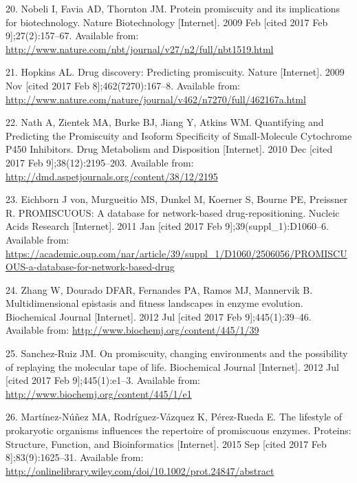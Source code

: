 \documentclass[12pt,twoside]{reedthesis}
\begin{document}
{  \hypertarget{ref-nobeli_protein_2009}{}
  20. Nobeli I, Favia AD, Thornton JM. Protein promiscuity and its
  implications for biotechnology. Nature Biotechnology {[}Internet{]}.
  2009 Feb {[}cited 2017 Feb 9{]};27(2):157--67. Available from:
  \url{http://www.nature.com/nbt/journal/v27/n2/full/nbt1519.html}
  
  \hypertarget{ref-hopkins_drug_2009}{}
  21. Hopkins AL. Drug discovery: Predicting promiscuity. Nature
  {[}Internet{]}. 2009 Nov {[}cited 2017 Feb 8{]};462(7270):167--8.
  Available from:
  \url{http://www.nature.com/nature/journal/v462/n7270/full/462167a.html}
  
  \hypertarget{ref-nath_quantifying_2010}{}
  22. Nath A, Zientek MA, Burke BJ, Jiang Y, Atkins WM. Quantifying and
  Predicting the Promiscuity and Isoform Specificity of Small-Molecule
  Cytochrome P450 Inhibitors. Drug Metabolism and Disposition
  {[}Internet{]}. 2010 Dec {[}cited 2017 Feb 9{]};38(12):2195--203.
  Available from: \url{http://dmd.aspetjournals.org/content/38/12/2195}
  
  \hypertarget{ref-von_eichborn_promiscuous:_2011}{}
  23. Eichborn J von, Murgueitio MS, Dunkel M, Koerner S, Bourne PE,
  Preissner R. PROMISCUOUS: A database for network-based
  drug-repositioning. Nucleic Acids Research {[}Internet{]}. 2011 Jan
  {[}cited 2017 Feb 9{]};39(suppl\_1):D1060--6. Available from:
  \url{https://academic.oup.com/nar/article/39/suppl_1/D1060/2506056/PROMISCUOUS-a-database-for-network-based-drug}
  
  \hypertarget{ref-zhang_multidimensional_2012}{}
  24. Zhang W, Dourado DFAR, Fernandes PA, Ramos MJ, Mannervik B.
  Multidimensional epistasis and fitness landscapes in enzyme evolution.
  Biochemical Journal {[}Internet{]}. 2012 Jul {[}cited 2017 Feb
  9{]};445(1):39--46. Available from:
  \url{http://www.biochemj.org/content/445/1/39}
  
  \hypertarget{ref-sanchez-ruiz_promiscuity_2012}{}
  25. Sanchez-Ruiz JM. On promiscuity, changing environments and the
  possibility of replaying the molecular tape of life. Biochemical Journal
  {[}Internet{]}. 2012 Jul {[}cited 2017 Feb 9{]};445(1):e1--3. Available
  from: \url{http://www.biochemj.org/content/445/1/e1}
  
  \hypertarget{ref-martinez-nunez_lifestyle_2015}{}
  26. Martínez-Núñez MA, Rodríguez-Vázquez K, Pérez-Rueda E. The lifestyle
  of prokaryotic organisms influences the repertoire of promiscuous
  enzymes. Proteins: Structure, Function, and Bioinformatics
  {[}Internet{]}. 2015 Sep {[}cited 2017 Feb 8{]};83(9):1625--31.
  Available from:
  \url{http://onlinelibrary.wiley.com/doi/10.1002/prot.24847/abstract}
  
}
\end{document}
